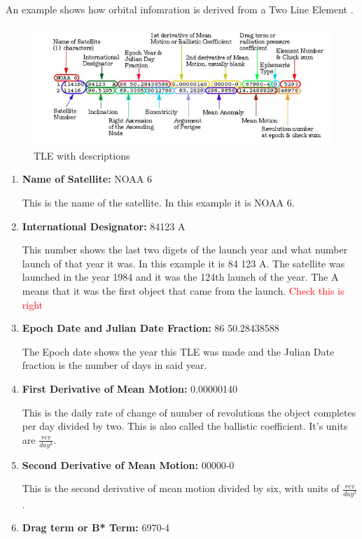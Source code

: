 \documentclass[12pt]{report}
\begin{document}
	An example shows how orbital infomration is derived from a Two Line Element \cite{NASATLE}.
	\begin{figure}[h!]
		\centering
		\includegraphics[width=0.7\linewidth]{tle_nasa}
		\caption{TLE with descriptions}
		\label{fig:tlenasa}
	\end{figure}
	
	\begin{enumerate}
		\item \textbf{Name of Satellite:} NOAA 6
		
		This is the name of the satellite. In this example it is NOAA 6.
		\item 	\textbf{International Designator:} 84123 A
		
		This number shows the last two digets of the launch year and what number launch of that year it was. In this example it is 84 123 A. The satellite was launched in the year 1984 and it was the 124th launch of the year. The A means that it was the first object that came from the launch. \textcolor{red}{Check this is right}
		
		\item \textbf{Epoch Date and Julian Date Fraction:} 86 50.28438588
		
		The Epoch date shows the year this TLE was made and the Julian Date fraction is the number of days in said year. 
		
		\item \textbf{First Derivative of Mean Motion:} 0.00000140
		
		This is the daily rate of change of number of revolutions the object completes per day divided by two. This is also called the ballistic coefficient.\cite{NASATLE} It's units are $\frac{rev}{day^2}$. 
		
		\item \textbf{Second Derivative of Mean Motion:} 00000-0
		
		This is the second derivative of mean motion divided by six, with units of $\frac{rev}{day^3}$.
		
		\item \textbf{Drag term or B* Term: }6970-4
		

\end{enumerate}
\end{document}
